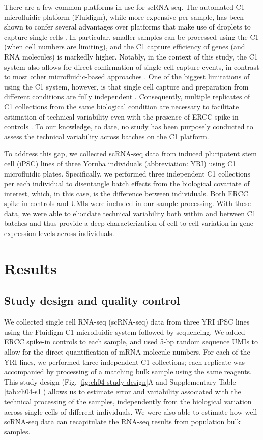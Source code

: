 There are a few common platforms in use for scRNA-seq. The automated C1
microfluidic platform (Fluidigm), while more expensive per sample, has
been shown to confer several advantages over platforms that make use of
droplets to capture single cells \citep{Wu2014, Macosko2015}. In
particular, smaller samples can be processed using the C1 (when cell
numbers are limiting), and the C1 capture efficiency of genes (and RNA
molecules) is markedly higher. Notably, in the context of this study,
the C1 system also allows for direct confirmation of single cell capture
events, in contrast to most other microfluidic-based approaches
\citep{Macosko2015, Klein2015}. One of the biggest limitations of using
the C1 system, however, is that single cell capture and preparation from
different conditions are fully independent \citep{Hicks2015}.
Consequently, multiple replicates of C1 collections from the same
biological condition are necessary to facilitate estimation of technical
variability even with the presence of ERCC spike-in controls
\citep{Stegle2015}. To our knowledge, to date, no study has been
purposely conducted to assess the technical variability across batches
on the C1 platform.

To address this gap, we collected scRNA-seq data from induced
pluripotent stem cell (iPSC) lines of three Yoruba individuals
(abbreviation: YRI) using C1 microfluidic plates. Specifically, we
performed three independent C1 collections per each individual to
disentangle batch effects from the biological covariate of interest,
which, in this case, is the difference between individuals. Both ERCC
spike-in controls and UMIs were included in our sample processing. With
these data, we were able to elucidate technical variability both within
and between C1 batches and thus provide a deep characterization of
cell-to-cell variation in gene expression levels across individuals.

\section{Results}\label{ch04-results}

\subsection{Study design and quality
control}\label{study-design-and-quality-control}

We collected single cell RNA-seq (scRNA-seq) data from three YRI iPSC
lines using the Fluidigm C1 microfluidic system followed by sequencing.
We added ERCC spike-in controls to each sample, and used 5-bp random
sequence UMIs to allow for the direct quantification of mRNA molecule
numbers. For each of the YRI lines, we performed three independent C1
collections; each replicate was accompanied by processing of a matching
bulk sample using the same reagents. This study design (Fig. \ref{fig:ch04-study-design}A and
Supplementary Table \ref{tab:ch04-s1}) allows us to estimate error and variability
associated with the technical processing of the samples, independently
from the biological variation across single cells of different
individuals. We were also able to estimate how well scRNA-seq data can
recapitulate the RNA-seq results from population bulk samples.

